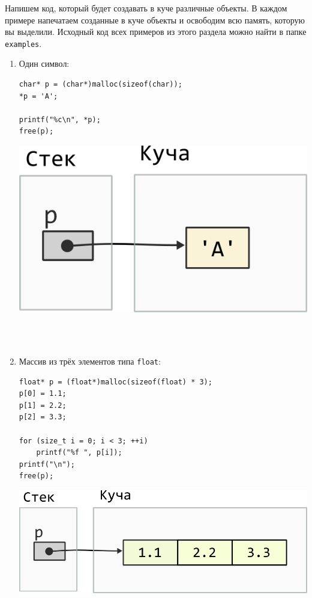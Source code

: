 \documentclass[10pt]{article}
\begin{document}
Напишем код, который будет создавать в куче различные объекты. В каждом примере напечатаем созданные в куче объекты и освободим всю память, которую вы выделили. Исходный код всех примеров из этого раздела можно найти в папке \texttt{examples}.
\begin{enumerate}


\item Один символ:\\
\noindent\begin{minipage}{.50\textwidth}
\begin{lstlisting}[style=boxStyle]
char* p = (char*)malloc(sizeof(char));
*p = 'A';

printf("%c\n", *p);
free(p);
\end{lstlisting}
\end{minipage}\hfill
\begin{minipage}{.40\textwidth}
\includegraphics[scale=0.7]{../images/malloc_class_tasks/heap_char.png}
\end{minipage}
\quad\\
\quad\\


\item Массив из трёх элементов типа \texttt{float}:\\
\noindent\begin{minipage}{.50\textwidth}
\begin{lstlisting}[style=boxStyle]
float* p = (float*)malloc(sizeof(float) * 3);
p[0] = 1.1;
p[1] = 2.2;
p[2] = 3.3;

for (size_t i = 0; i < 3; ++i)
    printf("%f ", p[i]);
printf("\n");
free(p);
\end{lstlisting}
\end{minipage}\hfill
\begin{minipage}{.4\textwidth}
\includegraphics[scale=0.7]{../images/malloc_class_tasks/heap_double_array.png}
\end{minipage}
\quad\\
\quad\\



\end{enumerate}
\end{document}
